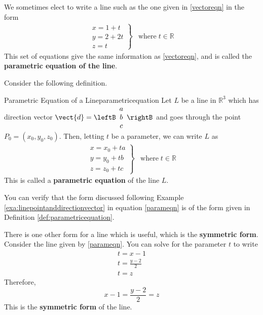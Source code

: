 We sometimes elect to write a line such as the one given in \ref{vectoreqn} in the form
\begin{equation}
\begin{array}{ll}
\left. \begin{array}{l}
x=1+t \\
y=2+2t \\
z=t 
\end{array} \right\} & 
\mbox{where} \; t\in \mathbb{R} 
\end{array}
\label{parameqn}
\end{equation}
This set of equations give the same information as \ref{vectoreqn}, and is called the \textbf{parametric equation of the line}. 

Consider the following definition. 

\begin{definition}{Parametric Equation of a Line}{parametricequation}
Let $L$ be a line in $\mathbb{R}^3$ which has direction vector $\vect{d} = \leftB
\begin{array}{c}
a \\
b \\
c
\end{array}
\rightB$
and goes through the point $P_0 = \left( x_0, y_0, z_0 \right)$.
Then, letting $t$ be a parameter, we can write $L$ as 
\begin{equation*}
\begin{array}{ll}
\left.
\begin{array}{c}
x = x_0 + ta \\
y = y_0 + tb \\
z = z_0 + tc
\end{array}
\right\} & 
\mbox{where} \; t\in \mathbb{R} 
\end{array}
\end{equation*}
This is called a \textbf{parametric equation} of the line $L$.
\end{definition}

You can verify that the form discussed following Example \ref{exa:linepointanddirectionvector} in equation  \ref{parameqn} is of the form
given in Definition \ref{def:parametricequation}.

There is one other form for a line which is useful, which is the \textbf{symmetric form}. 
Consider the line given by  \ref{parameqn}. You can
solve for the parameter $t$ to write
\begin{equation*}
\begin{array}{l}
t=x-1 \\
t=\frac{y-2}{2} \\
t=z
\end{array}
\end{equation*}
Therefore, 
\begin{equation*}
x-1=\frac{y-2}{2}=z
\end{equation*}
This is the \textbf{symmetric form} of the line.

